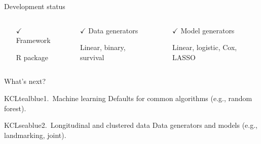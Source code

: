 \documentclass[11pt]{beamer}
\newcommand*{\tc}[2]{%
    \textcolor{#1}{#2}
}
\newcommand{\sgap}{\vspace{0.5em}}
\begin{document}
\begin{frame}[c]{Development status}


		\begin{columns}
			\begin{column}[T]{0.24\textwidth}
				\begin{itemize}
					\item[$\checkmark$]  Framework
					\item[] {\scriptsize R package}
				\end{itemize}
			\end{column}
			\begin{column}[T]{0.32\textwidth}
				\begin{itemize}
					\item[$\checkmark$]  Data generators
					\item[] {\scriptsize Linear, binary, survival}
				\end{itemize}
			\end{column}
			\begin{column}[T]{0.39\textwidth}
				\begin{itemize}
					\item[$\checkmark$] Model generators
					\item[] {\scriptsize Linear, logistic, Cox, LASSO}
				\end{itemize}
			\end{column}
		\end{columns}


	\vspace{2em}
	{\large \tc{KCLseablue}{What's next?}}
	\sgap

	\begin{cbox}{KCLtealblue}{1.\ Machine learning}
		Defaults for common algorithms (e.g., random forest).

	\end{cbox}

	\begin{cbox}{KCLseablue}{2.\ Longitudinal and clustered data}
		Data generators and models (e.g., landmarking, joint).
	\end{cbox}

\end{frame}
\end{document}
